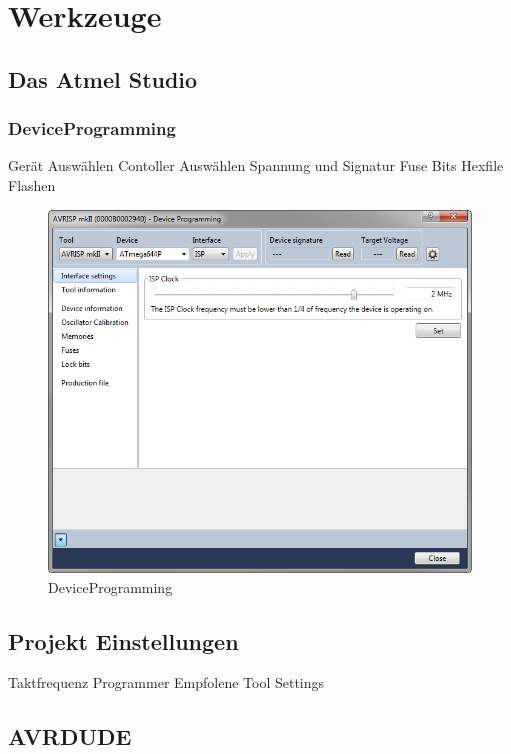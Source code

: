 \chapter{Werkzeuge}

\section{Das Atmel Studio}

\subsection{DeviceProgramming}

Gerät Auswählen
Contoller Auswählen
Spannung und Signatur
Fuse Bits
Hexfile Flashen

\begin{figure}[h]
\centering
\includegraphics[width=13cm]{content/pictures/Anleitung/neuerProzessor/AnleitungNeuerProzessor1.png}
\caption{DeviceProgramming}
\label{fig:B3}
\end{figure}

\section{Projekt Einstellungen}

Taktfrequenz
Programmer
Empfolene Tool Settings

\section{AVRDUDE}